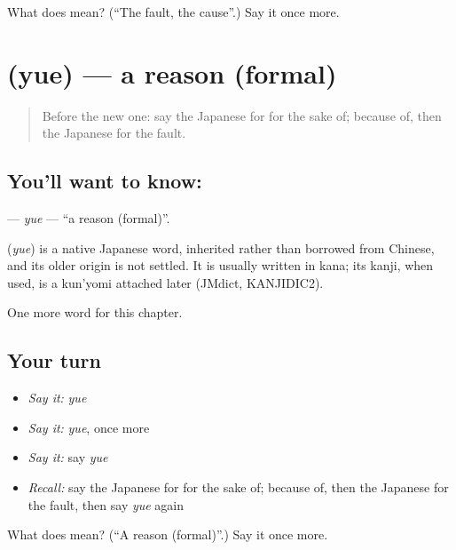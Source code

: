 \begin{tcolorbox}[breakable,colback=teal!4,colframe=teal!35!black,title={Before you move on}]
What does  mean? (\textquotedblleft{}The fault, the cause\textquotedblright{}.) Say it once more.
\end{tcolorbox}
\section[\texorpdfstring{\ja{ゆえ} (yue)}{ゆえ (yue)}]{ (yue) — a reason (formal)}

\label{lesson:JA-C98-yue}



\begin{quote}
Before the new one: say the Japanese for for the sake of; because of, then the Japanese for the fault.
\end{quote}

\subsection*{You'll want to know: }
\textbf{} — \emph{yue} — \textquotedblleft{}a reason (formal)\textquotedblright{}.

\begin{cousinweb}
\textbf{} (\emph{yue}) is a native Japanese word, inherited rather than borrowed from Chinese, and its older origin is not settled. It is usually written in kana; its kanji, when used, is a kun'yomi attached later (JMdict, KANJIDIC2).
\end{cousinweb}

\begin{grammarlens}[title={What you've built}]
One more word for this chapter.
\end{grammarlens}

\subsection*{Your turn}
\begin{itemize}
\raggedright
  \item \emph{Say it:} \emph{yue}
  \item \emph{Say it:} \emph{yue}, once more
  \item \emph{Say it:} say \emph{yue}
  \item \emph{Recall:} say the Japanese for for the sake of; because of, then the Japanese for the fault, then say \emph{yue} again
\end{itemize}

\begin{tcolorbox}[breakable,colback=teal!4,colframe=teal!35!black,title={Before you move on}]
What does  mean? (\textquotedblleft{}A reason (formal)\textquotedblright{}.) Say it once more.
\end{tcolorbox}
